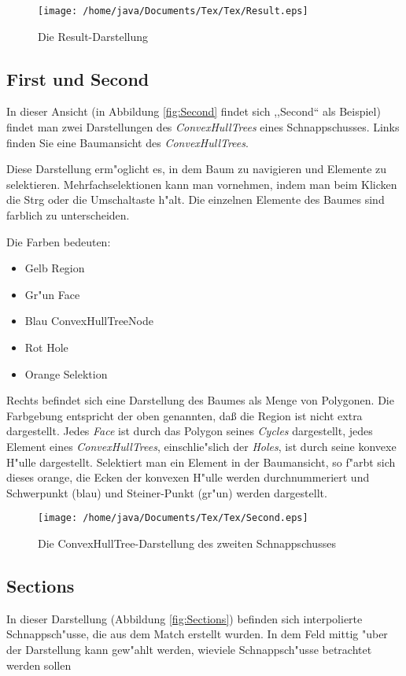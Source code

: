 \begin{figure}
   \centering
   \texttt{[image: /home/java/Documents/Tex/Tex/Result.eps]}
   \caption{Die Result-Darstellung}
   \label{fig:Result}
\end{figure}
\subsection{First und Second}
In dieser Ansicht (in Abbildung \vref{fig:Second} findet sich ,,Second`` als Beispiel) findet man zwei Darstellungen des \textit{ConvexHullTrees} eines Schnappschusses. Links finden Sie eine Baum\-ansicht des \textit{ConvexHullTrees}.

Diese Darstellung erm"oglicht es, in dem Baum zu navigieren und Elemente zu selektieren. Mehrfachselektionen kann man vornehmen, indem man beim Klicken die Strg oder die Umschaltaste h"alt. Die einzelnen Elemente des Baumes sind farblich zu unterscheiden.

Die Farben bedeuten:
\begin{itemize}
\item Gelb Region
\item Gr"un Face
\item Blau ConvexHullTreeNode
\item Rot Hole
\item Orange Selektion
\end{itemize} 

Rechts befindet sich eine Darstellung des Baumes als Menge von Polygonen. Die Farbgebung entspricht der oben genannten, daß die Region ist nicht extra dargestellt. Jedes \textit{Face} ist durch das Polygon seines \textit{Cycles} dargestellt, jedes Element eines \textit{ConvexHullTrees}, einschlie"slich der \textit{Holes}, ist durch seine konvexe H"ulle dargestellt. Selektiert man ein Element in der Baumansicht, so f"arbt sich dieses orange, die Ecken der konvexen H"ulle werden durchnummeriert und Schwerpunkt (blau) und Steiner-Punkt (gr"un) werden dargestellt.

\begin{figure}
   \centering
   \texttt{[image: /home/java/Documents/Tex/Tex/Second.eps]}
   \caption{Die ConvexHullTree-Darstellung des zweiten Schnappschusses}
   \label{fig:Second}
\end{figure}
\subsection{Sections}
In dieser Darstellung (Abbildung \vref{fig:Sections}) befinden  sich interpolierte Schnappsch"usse, die aus dem Match erstellt wurden. In dem Feld mittig "uber der Darstellung kann gew"ahlt werden, wieviele Schnappsch"usse betrachtet werden sollen 


